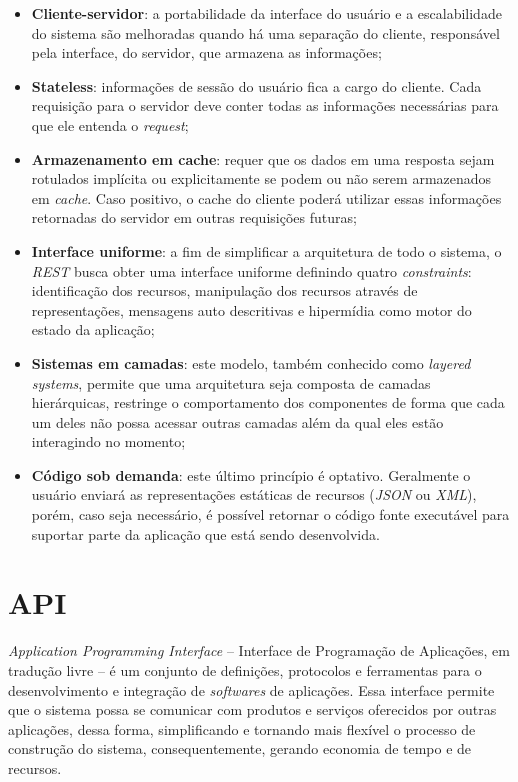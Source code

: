 \begin{itemize}
	\item \textbf{Cliente-servidor}: a portabilidade da interface do usuário e a escalabilidade do sistema  são melhoradas quando há uma separação do cliente, responsável pela interface, do servidor, que armazena as informações;
	\item \textbf{Stateless}: informações de sessão do usuário fica a cargo do cliente. Cada requisição para o servidor deve conter todas as informações necessárias para que ele entenda o \textit{request};
	\item \textbf{Armazenamento em cache}: requer que os dados em uma resposta sejam rotulados implícita ou explicitamente se podem ou não serem armazenados em \textit{cache}. Caso positivo, o cache do cliente poderá utilizar essas informações retornadas do servidor em outras requisições futuras;
	\item \textbf{Interface uniforme}: a fim de simplificar a arquitetura de todo o sistema, o \textit{REST} busca obter uma interface uniforme definindo quatro \textit{constraints}: identificação dos recursos, manipulação dos recursos através de representações, mensagens auto descritivas e hipermídia como motor do estado da aplicação;
	\item \textbf{Sistemas em camadas}: este modelo, também conhecido como \textit{layered systems}, permite que uma arquitetura seja composta de camadas hierárquicas, restringe o comportamento dos componentes de forma que cada um deles não possa acessar outras camadas além da qual eles estão interagindo no momento;
	\item \textbf{Código sob demanda}: este último princípio é optativo. Geralmente o usuário enviará as representações estáticas de recursos (\textit{JSON} ou \textit{XML}), porém, caso seja necessário, é possível retornar o código fonte executável para suportar parte da aplicação que está sendo desenvolvida.
\end{itemize}

\section{API}

\textit{Application Programming Interface} – Interface de Programação de Aplicações, em tradução livre – é um conjunto de definições, protocolos e ferramentas para o desenvolvimento e integração de \textit{softwares} de aplicações. Essa interface permite que o sistema possa se comunicar com produtos e serviços oferecidos por outras aplicações, dessa forma, simplificando e tornando mais flexível o processo de construção do sistema, consequentemente, gerando economia de tempo e de recursos.

